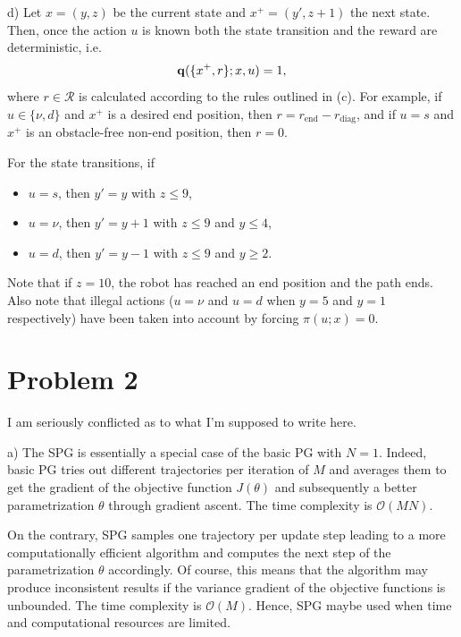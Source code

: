 \documentclass[12pt]{article}
\begin{document}
d) Let \(x = (y, z) \) be the current state and \(x^+ = (y', z+1)\) the next state. Then, once the action \(u \) is known both the state transition and the reward are deterministic, i.e. 
\begin{equation*}
    \vb q(\{x^+, r\}; x, u) = 1, 
\end{equation*}
where \(r \in \mathcal{R}\) is calculated according to the rules outlined in (c). For example, if \(u \in \{\nu, d\}\) and \(x^+\) is a desired end position, then \(r = r_\text{end} - r_\text{diag}\), and if \(u = s \) and \(x^+ \) is an obstacle-free non-end position, then \(r = 0 \). 

For the state transitions, if 
\begin{itemize}
    \item \(u = s \), then \(y'=y \) with \(z \leq 9\), 
    \item \(u = \nu\), then \(y' = y + 1\) with \(z \leq 9 \) and \(y \leq 4\),
    \item \(u = d \), then \(y' = y - 1\) with \(z \leq 9 \) and \(y \geq 2\). 
\end{itemize} 
\pagebreak

Note that if \(z = 10 \), the robot has reached an end position and the path ends. 
Also note that illegal actions (\(u = \nu\) and \(u = d \) when \(y = 5 \) and \(y = 1 \) respectively) have been taken into account by forcing \(\pi (u; x) = 0 \). 

\section*{Problem 2} 
I am seriously conflicted as to what I'm supposed to write here. 

a) The SPG is essentially a special case of the basic PG with \(N = 1\). Indeed, basic PG tries out different trajectories per iteration of \(M \) and averages them to get the gradient of the objective function \(J(\theta )\) and subsequently a better parametrization \(\theta\) through gradient ascent. The time complexity is \(\mathcal{O } (MN)\). 

On the contrary, SPG samples one trajectory per update step leading to a more computationally efficient algorithm and computes the next step of the parametrization \(\theta\) accordingly. Of course, this means that the algorithm may produce inconsistent results if the variance gradient of the objective functions is unbounded. The time complexity is \(\mathcal{O }(M )\). 
Hence, SPG maybe used when time and computational resources are limited. 
\end{document}
